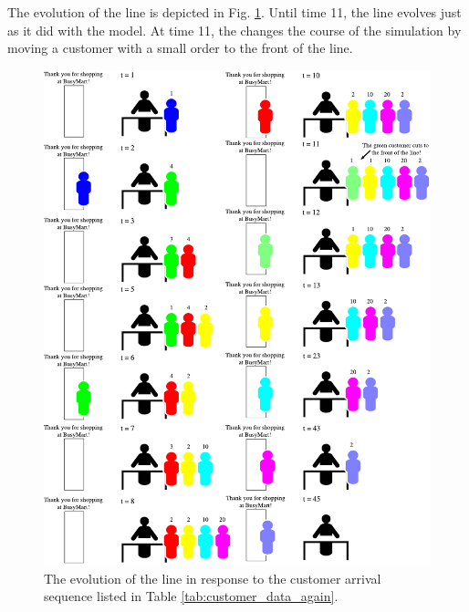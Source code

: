 The evolution of the  line is depicted in Fig. \ref{fig:clerk2_line}. Until time 11, the line evolves just as it did with the  model. At time 11, the  changes the course of the simulation by moving a customer with a small order to the front of the line.
\begin{figure}[ht]
\centering
\includegraphics[scale=0.75]{atomic_models_figs/clerk2.pdf}
\caption{The evolution of the  line in response to the customer arrival sequence listed in Table \ref{tab:customer_data_again}.}
\label{fig:clerk2_line}
\end{figure}
